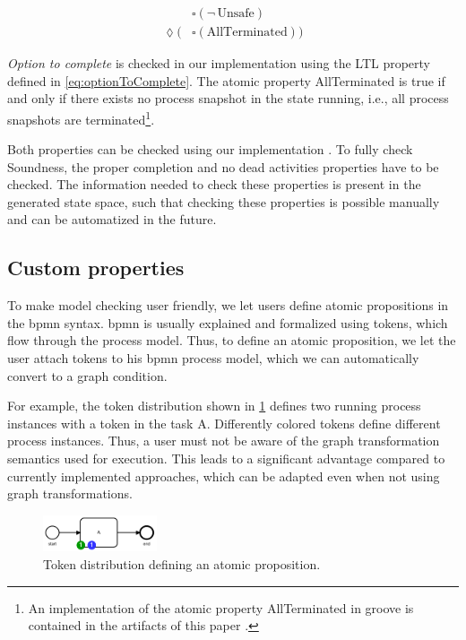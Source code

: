 \documentclass[adraft, copyright, creativecommons]{eptcs} %
\begin{document}
\begin{align}
    & \square (\neg \,\text{Unsafe}) \label{eq:safeness} \\
    \lozenge (& \square(\text{AllTerminated})) \label{eq:optionToComplete}
\end{align}

\emph{Option to complete} is checked in our implementation using the LTL property defined in \eqref{eq:optionToComplete}.
The atomic property \textsf{AllTerminated} is true if and only if there exists no process snapshot in the state running, i.e., all process snapshots are terminated\footnote{An implementation of the atomic property \textsf{AllTerminated} in groove is contained in the artifacts of this paper \cite{ArtifactsTERMGRAPH2022}.}.

Both properties can be checked using our implementation \cite{ArtifactsTERMGRAPH2022}.
To fully check Soundness, the proper completion and no dead activities properties have to be checked.
The information needed to check these properties is present in the generated state space, such that checking these properties is possible manually and can be automatized in the future.
\subsection{Custom properties}

To make model checking user friendly, we let users define atomic propositions in the \gls*{bpmn} syntax.
\gls*{bpmn} is usually explained and formalized using tokens, which flow through the process model.
Thus, to define an atomic proposition, we let the user attach tokens to his \gls*{bpmn} process model, which we can automatically convert to a graph condition.

For example, the token distribution shown in \cref{fig:atomicProposition} defines two running process instances with a token in the task A.
Differently colored tokens define different process instances.
Thus, a user must not be aware of the graph transformation semantics used for execution.
This leads to a significant advantage compared to currently implemented approaches, which can be adapted even when not using graph transformations.

\begin{figure}[h]
    \centering
    \includegraphics[width=0.3\textwidth]{images/bpmn_semantics-atomicProp.pdf}
    \caption{Token distribution defining an atomic proposition.}
    \label{fig:atomicProposition}
\end{figure}
\end{document}
